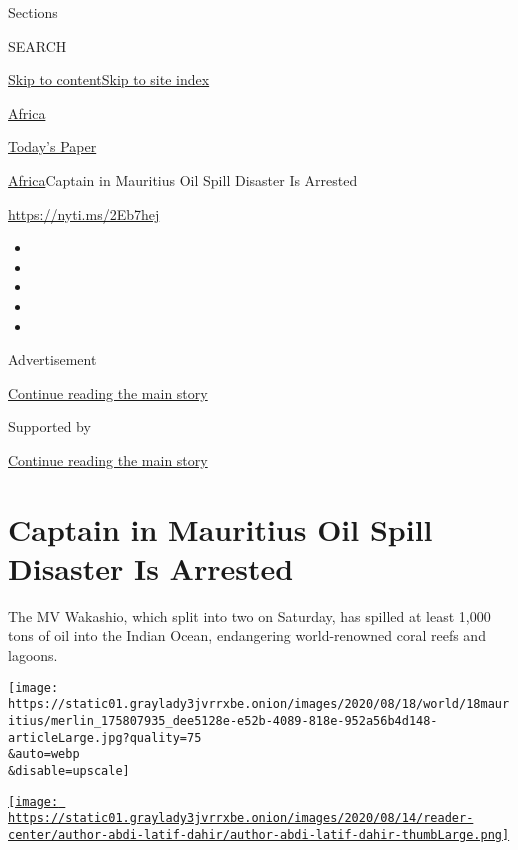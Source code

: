 Sections

SEARCH

\protect\hyperlink{site-content}{Skip to
content}\protect\hyperlink{site-index}{Skip to site index}

\href{https://www.nytimes3xbfgragh.onion/section/world/africa}{Africa}

\href{https://myaccount.nytimes3xbfgragh.onion/auth/login?response_type=cookie\&client_id=vi}{}

\href{https://www.nytimes3xbfgragh.onion/section/todayspaper}{Today's
Paper}

\href{/section/world/africa}{Africa}\textbar{}Captain in Mauritius Oil
Spill Disaster Is Arrested

\url{https://nyti.ms/2Eb7hej}

\begin{itemize}
\item
\item
\item
\item
\item
\end{itemize}

Advertisement

\protect\hyperlink{after-top}{Continue reading the main story}

Supported by

\protect\hyperlink{after-sponsor}{Continue reading the main story}

\hypertarget{captain-in-mauritius-oil-spill-disaster-is-arrested}{%
\section{Captain in Mauritius Oil Spill Disaster Is
Arrested}\label{captain-in-mauritius-oil-spill-disaster-is-arrested}}

The MV Wakashio, which split into two on Saturday, has spilled at least
1,000 tons of oil into the Indian Ocean, endangering world-renowned
coral reefs and lagoons.

\texttt{[image: https://static01.graylady3jvrrxbe.onion/images/2020/08/18/world/18mauritius/merlin\_175807935\_dee5128e-e52b-4089-818e-952a56b4d148-articleLarge.jpg?quality=75\\\&auto=webp\\\&disable=upscale]}

\href{https://www.nytimes3xbfgragh.onion/by/abdi-latif-dahir}{\texttt{[image: https://static01.graylady3jvrrxbe.onion/images/2020/08/14/reader-center/author-abdi-latif-dahir/author-abdi-latif-dahir-thumbLarge.png]}}

